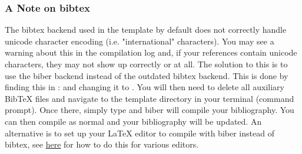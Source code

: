 \subsubsection{A Note on bibtex}

The bibtex backend used in the template by default does not correctly handle unicode character encoding (i.e. "international" characters). You may see a warning about this in the compilation log and, if your references contain unicode characters, they may not show up correctly or at all. The solution to this is to use the biber backend instead of the outdated bibtex backend. This is done by finding this in :  and changing it to . You will then need to delete all auxiliary BibTeX files and navigate to the template directory in your terminal (command prompt). Once there, simply type  and biber will compile your bibliography. You can then compile  as normal and your bibliography will be updated. An alternative is to set up your LaTeX editor to compile with biber instead of bibtex, see \href{http://tex.stackexchange.com/questions/154751/biblatex-with-biber-configuring-my-editor-to-avoid-undefined-citations/}{here} for how to do this for various editors.
